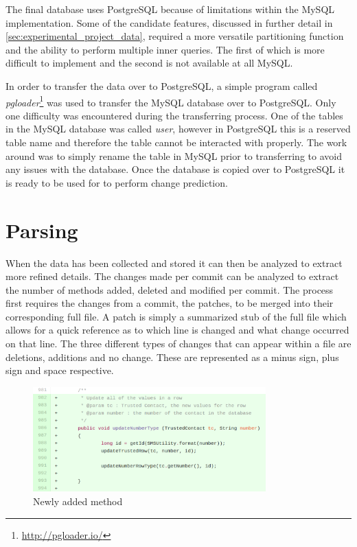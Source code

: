 The final database uses PostgreSQL because of limitations within the MySQL implementation. Some of the candidate features, discussed in further detail in \autoref{sec:experimental_project_data}, required a more versatile partitioning function and the ability to perform multiple inner queries. The first of which is more difficult to implement and the second is not available at all MySQL.

In order to transfer the data over to PostgreSQL, a simple program called \textit{pgloader}\footnote{\url{http://pgloader.io/}} was used to transfer the MySQL database over to PostgreSQL. Only one difficulty was encountered during the transferring process. One of the tables in the MySQL database was called \textit{user}, however in PostgreSQL this is a reserved table name and therefore the table cannot be interacted with properly. The work around was to simply rename the table in MySQL prior to transferring to avoid any issues with the database. Once the database is copied over to PostgreSQL it is ready to be used for to perform change prediction.

\section{Parsing}
\label{sec:parsing}

When the data has been collected and stored it can then be analyzed to extract more refined details. The changes made per commit can be analyzed to extract the number of methods added, deleted and modified per commit. The process first requires the changes from a commit, the patches, to be merged into their corresponding full file. A patch is simply a summarized stub of the full file which allows for a quick reference as to which line is changed and what change occurred on that line. The three different types of changes that can appear within a file are deletions, additions and no change. These are represented as a minus sign, plus sign and space respective.

\begin{figure}[!ht]
    \centering
        \includegraphics[width=0.80\textwidth]{images/added_example}
    \caption{Newly added method}
    \label{fig:added_method}
\end{figure}


